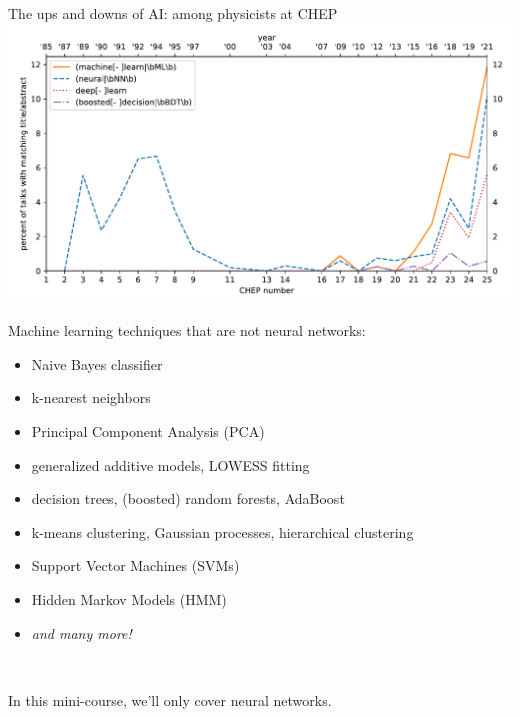 \documentclass[aspectratio=169]{beamer}
\begin{document}
\begin{frame}{The ups and downs of AI: among physicists at CHEP}
\vspace{0.25 cm}
\includegraphics[width=\linewidth]{img/chep-papers-ml.pdf}
\end{frame}

\begin{frame}{Machine learning techniques that are not neural networks:}
\vspace{0.5 cm}
\large

\begin{itemize}
\item Naive Bayes classifier
\item k-nearest neighbors
\item Principal Component Analysis (PCA)
\item generalized additive models, LOWESS fitting
\item decision trees, (boosted) random forests, AdaBoost
\item k-means clustering, Gaussian processes, hierarchical clustering
\item Support Vector Machines (SVMs)
\item Hidden Markov Models (HMM)
\item {\it and many more!}
\end{itemize}

\normalsize
\vspace{0.5 cm}
\end{frame}

\begin{frame}{\mbox{ }}
\begin{center}
\LARGE
In this mini-course, we'll only cover neural networks.

\large
\vspace{1 cm}
\end{center}
\end{frame}
\end{document}
